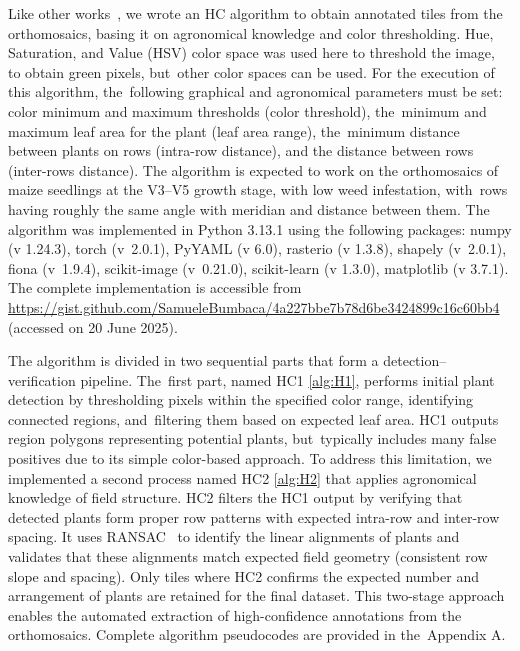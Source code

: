 \documentclass[12pt,a4paper,oneside]{report}
\begin{document}
Like other works~\cite{davidPlantDetectionCounting2021,garcia-martinezDigitalCountCorn2020,liuEstimatingMaizeSeedling2022},
we wrote an HC algorithm to obtain annotated tiles from the orthomosaics, 
basing it on agronomical knowledge and color thresholding.
Hue, Saturation, and Value (HSV) color space was used here to threshold the image,
to obtain green pixels, but~other color spaces can be used.
For the execution of this algorithm, the~following graphical and agronomical 
parameters must be set: color minimum and maximum thresholds (color threshold), the~minimum and maximum 
leaf area for the plant (leaf area range), the~minimum distance between plants on rows (intra-row distance),
and the distance between rows (inter-rows distance). 
The algorithm is expected to work on the orthomosaics of maize seedlings at the V3--V5 growth stage,
with low weed infestation, with~rows having roughly the same angle with meridian and distance between them.
The algorithm was implemented in Python 3.13.1 using the following packages: 
numpy (v 1.24.3), torch (\mbox{v 2.0.1}), PyYAML (v 6.0), rasterio (v 1.3.8), shapely (\mbox{v 2.0.1}), 
fiona (\mbox{v 1.9.4}), scikit-image (\mbox{v 0.21.0}), scikit-learn (v 1.3.0), matplotlib (v 3.7.1). 
The complete implementation is accessible from %
\url{https://gist.github.com/SamueleBumbaca/4a227bbe7b78d6be3424899c16c60bb4} (accessed on 20 June 2025).

The algorithm is divided in two sequential parts that form a detection--verification pipeline. The~first part,
named HC1 \cref{alg:H1}, performs initial plant detection by thresholding pixels within the specified color range, 
identifying connected regions, and~filtering them based on expected leaf area. HC1 outputs region polygons
representing potential plants, but~typically includes many false positives due to its simple color-based approach.
To address this limitation, we implemented a second process named HC2 \mbox{\cref{alg:H2}} that applies agronomical 
knowledge of field structure. HC2 filters the HC1 output by verifying that detected plants form proper row 
patterns with expected intra-row and inter-row spacing. It uses RANSAC~\cite{fischlerRandomSampleConsensus1987} to identify the linear alignments of plants 
and validates that these alignments match expected field geometry (consistent row slope and spacing).
Only tiles where HC2 confirms the expected number and arrangement of plants are retained for the final dataset.
This two-stage approach enables the automated extraction of high-confidence annotations from the orthomosaics.
Complete algorithm pseudocodes are provided in the~Appendix A.
\end{document}
